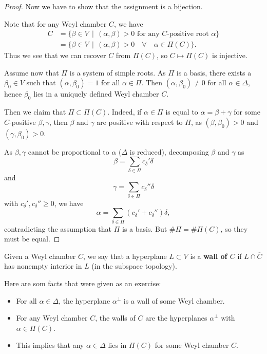 \documentclass[11pt, english]{article}
\begin{document}
\begin{proof}
Now we have to show that the assignment is a bijection.

Note that for any Weyl chamber $C$, we have
\begin{align*}
  C &= \{ \beta \in V \, \mid \,  (\alpha,\beta) > 0 \text{ for any $C$-positive root } \alpha \} \\
&= \{ \beta \in V \, \mid \, (\alpha,\beta) > 0 \quad  \forall \quad \alpha \in \Pi(C) \}.
\end{align*}
Thus we see that we can recover $C$ from $\Pi(C)$, so $C \mapsto \Pi(C)$ is injective.

Assume now that $\Pi$ is a system of simple roots. As $\Pi$ is a basis, there exists a $\beta_0 \in V$ such that $(\alpha,\beta_0)=1$ for all $\alpha \in \Pi$. Then $(\alpha,\beta_0) \neq 0$ for all $\alpha \in \Delta$, hence $\beta_0$ lies in a uniquely defined Weyl chamber $C$.

Then we claim that $\Pi \subset \Pi(C)$. Indeed, if $\alpha \in \Pi$ is equal to $\alpha=\beta+\gamma$ for some $C$-positive $\beta,\gamma$, then $\beta$ and $\gamma$ are positive with respect to $\Pi$, as $(\beta,\beta_0)  >0$ and $(\gamma, \beta_0) > 0$. 

As $\beta, \gamma$ cannot be proportional to $\alpha$ ($\Delta$ is reduced), decomposing $\beta$ and $\gamma$ as 
$$
\beta = \sum_{\delta \in \Pi} c_\delta' \delta
$$
and 
$$
\gamma = \sum_{\delta \in \Pi} c_{\delta}'' \delta
$$
with $c_\delta',c_\delta'' \geq 0$, we have 
$$
\alpha = \sum_{\delta \in \Pi} (c_\delta' + c_\delta'') \delta,
$$
contradicting the assumption that $\Pi$ is a basis. But $\# \Pi = \# \Pi(C)$, so they must be equal.
\end{proof}

Given a Weyl chamber $C$, we say that a hyperplane $L \subset V$ is a \textbf{wall of $C$} if $L \cap \overline C$ has nonempty interior in $L$ (in the subspace topology). 

Here are som facts that were given as an exercise:
\begin{itemize}
\item For all $\alpha \in \Delta$, the hyperplane $\alpha^\perp$ is a wall of some Weyl chamber.
\item For any Weyl chamber $C$, the walls of $C$ are the hyperplanes $\alpha^\perp$ with $\alpha \in \Pi(C)$. 
\item This implies that any $\alpha \in \Delta$ lies in $\Pi(C)$ for some Weyl chamber $C$.
\end{itemize}
\end{document}
